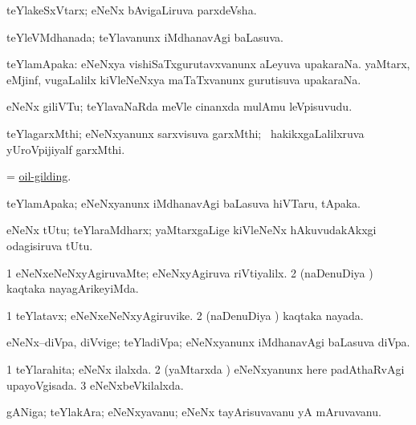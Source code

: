 \bentry
{}
\gl{\nA}
\bmng
teYlakeSxVtarx; eNeNx bAvigaLiruva parxdeVsha. 
\emng
\eentry

\bentry
{}
\gl{\gu}
\bmng
teYleVMdhanada; teYlavanunx iMdhanavAgi baLasuva. 
\emng
\eentry

\bentry
{}
\gl{\nA}
\bmng
teYlamApaka: 
\banum
{} eNeNxya vishiSaTxgurutavxvanunx aLeyuva upakaraNa. 
 yaMtarx, eMjinf, \mo vugaLalilx kiVleNeNxya maTaTxvanunx gurutisuva upakaraNa. 
\eanum
\emng
\eentry

\bentry
{}
\gl{\nA}
\bmng
eNeNx giliVTu; teYlavaNaRda meVle cinanxda mulAmu leVpisuvudu. 
\emng
\eentry

\bentry
{}
\gl{\nA}
\bmng
teYlagarxMthi; eNeNxyanunx sarxvisuva garxMthi; \kanmu\ hakikxgaLalilxruva yUroVpijiyalf garxMthi. 
\emng
\eentry

\bentry
{}
\gl{\nA}
\bmng
= \hyperlink{oil-gilding}{oil-gilding}. 
\emng
\eentry

\bentry
{}
\gl{\nA}
\bmng
teYlamApaka; eNeNxyanunx iMdhanavAgi baLasuva hiVTaru, tApaka. 
\emng
\eentry

\bentry
{}
\gl{\nA}
\bmng
eNeNx tUtu; teYlaraMdharx; yaMtarxgaLige kiVleNeNx hAkuvudakAkxgi odagisiruva tUtu. 
\emng
\eentry

\bentry
{}
\gl{\kirxvi}
\bmng
\bnum
\num{1} eNeNxeNeNxyAgiruvaMte; eNeNxyAgiruva riVtiyalilx. 
\num{2} (naDenuDiya \vi) kaqtaka nayagArikeyiMda. 
\enum
\emng
\eentry

\bentry
{}
\gl{\nA}
\bmng
% 
\bnum
\num{1} teYlatavx; eNeNxeNeNxyAgiruvike. 
\num{2} (naDenuDiya \vi) kaqtaka nayada. 
\enum
\emng
\eentry

\bentry
{}
\gl{\nA}
\bmng
eNeNx--diVpa, diVvige; teYladiVpa; eNeNxyanunx iMdhanavAgi baLasuva diVpa. 
\emng
\eentry

\bentry
{}
\gl{\gu}
\bmng
% 
\bnum
\num{1} teYlarahita; eNeNx ilalxda. 
\num{2} (yaMtarxda \vi) eNeNxyanunx here padAthaRvAgi upayoVgisada. 
\num{3} eNeNxbeVkilalxda. 
\enum
\emng
\eentry

\bentry
{}
\gl{\nA}
\bmng
gANiga; teYlakAra; eNeNxyavanu; eNeNx tayArisuvavanu yA mAruvavanu. 
\emng
\eentry

